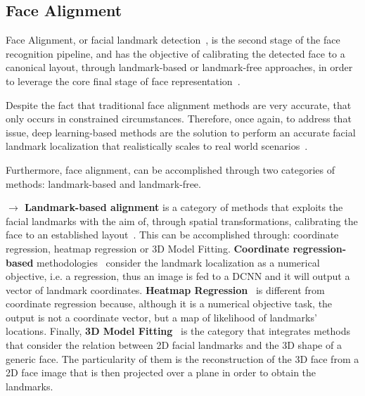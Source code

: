 \documentclass[class=report, crop=false, a4paper, 12pt]{standalone}
\begin{document}
\subsection{Face Alignment}
\par Face Alignment, or facial landmark detection~\autocite{changFacePoseNetMakingCase2017}, is the second stage of the face recognition pipeline, and has the objective of calibrating the detected face to a canonical layout, through landmark-based or landmark-free approaches, in order to leverage the core final stage of face representation~\autocite{duElementsEndtoendDeep2022}. 
\par Despite the fact that traditional face alignment methods are very accurate, that only occurs in constrained circumstances. Therefore, once again, to address that issue, deep learning-based methods are the solution to perform an accurate facial landmark localization that realistically scales to real world scenarios~\autocite{fengWingLossRobust2018}. 
\par Furthermore, face alignment, can be accomplished through two categories of methods: landmark-based and landmark-free.

\vspace{0.7\baselineskip}
\noindent\textbf{$\rightarrow$ Landmark-based alignment} is a category of methods that exploits the facial landmarks with the aim of, through spatial transformations, calibrating the face to an established layout~\autocite{duElementsEndtoendDeep2022}. This can be accomplished through: coordinate regression, heatmap regression or 3D Model Fitting. \textbf{Coordinate regression-based} methodologies~\autocite{fengWingLossRobust2018,liuTwoStreamTransformerNetworks2018,zhangJointFaceDetection2016a} consider the landmark localization as a numerical objective, i.e. a regression, thus an image is fed to a DCNN and it will output a vector of landmark coordinates. \textbf{Heatmap Regression}~\autocite{dengJointMultiviewFace2017,wuLookBoundaryBoundaryAware2018,chenFaceAlignmentKernel2019} is different from coordinate regression because, although it is a numerical objective task, the output is not a coordinate vector, but a map of likelihood of landmarks' locations. Finally, \textbf{3D Model Fitting}~\autocite{bhagavatulaFasterRealtimeFacial2017,changFacePoseNetMakingCase2017,xiaoRecurrent3D2DDual2017} is the category that integrates methods that consider the relation between 2D facial landmarks and the 3D shape of a generic face. The particularity of them is the reconstruction of the 3D face from a 2D face image that is then projected over a plane in order to obtain the landmarks. 
\end{document}
